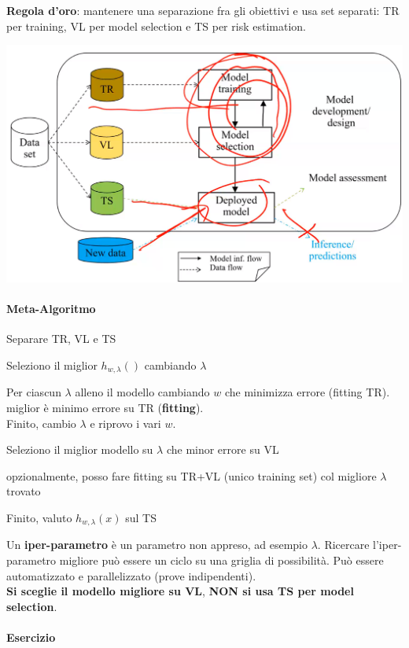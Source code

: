 \documentclass[10pt]{book}
\begin{document}
\textbf{Regola d'oro}: mantenere una separazione fra gli obiettivi e usa set separati: TR per training, VL per model selection e TS per risk estimation.
\begin{center}
	\includegraphics[scale=0.55]{trvlts.png}
\end{center}
\paragraph{Meta-Algoritmo}
\begin{list}{}{}
	\item Separare TR, VL e TS
	\item Seleziono il miglior $h_{w, \lambda}()$ cambiando $\lambda$
	\item Per ciascun $\lambda$ alleno il modello cambiando $w$ che minimizza errore (fitting TR). miglior è minimo errore su TR (\textbf{fitting}).\\Finito, cambio $\lambda$ e riprovo i vari $w$.
	\item Seleziono il miglior modello su $\lambda$ che minor errore su VL
	\item opzionalmente, posso fare fitting su TR+VL (unico training set) col migliore $\lambda$ trovato
	\item Finito, valuto $h_{w,\lambda}(x)$ sul TS
\end{list}
Un \textbf{iper-parametro} è un parametro non appreso, ad esempio $\lambda$. Ricercare l'iper-parametro migliore può essere un ciclo su una griglia di possibilità. Può essere automatizzato e parallelizzato (prove indipendenti).\\
\textbf{Si sceglie il modello migliore su VL}, \textbf{NON si usa TS per model selection}.
\paragraph{Esercizio} %
\end{document}
